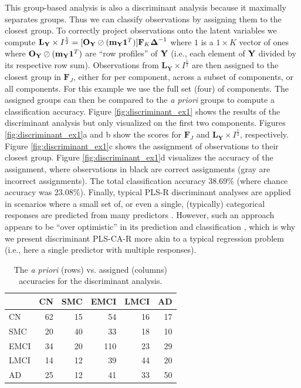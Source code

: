\documentclass[12pt]{article}
\begin{document}
This group-based analysis is also a discriminant analysis because it
maximally separates groups. Thus we can classify observations by
assigning them to the closest group. To correctly project observations
onto the latent variables we compute
\({\mathbf L}_{\mathbf Y} \times I^{\frac{1}{2}} = [{\bf O}_{\bf Y} \oslash ({\bf m}_{\bf Y}{\bf 1}^T)]{\bf F}_{K}\boldsymbol{\Delta}^{-1}\)
where \(1\) is a \(1 \times K\) vector of ones where
\({\bf O}_{\bf Y} \oslash ({\bf m}_{\bf Y}{\bf 1}^T)\) are ``row
profiles'' of \({\bf Y}\) (i.e., each element of \({\bf Y}\) divided by
its respective row sum). Observations from
\({\mathbf L}_{\mathbf Y} \times I^{\frac{1}{2}}\) are then assigned to
the closest group in \({\mathbf F}_{J}\), either for per component,
across a subset of components, or all components. For this example we
use the full set (four) of components. The assigned groups can then be
compared to the \emph{a priori} groups to compute a classification
accuracy. Figure \ref{fig:discriminant_ex1} shows the results of the
discriminant analysis but only visualized on the first two components.
Figures \ref{fig:discriminant_ex1}a and b show the scores for
\({\mathbf F}_{J}\) and
\({\mathbf L}_{\mathbf Y} \times I^{\frac{1}{2}}\), respectively. Figure
\ref{fig:discriminant_ex1}c shows the assignment of observations to
their closest group. Figure \ref{fig:discriminant_ex1}d visualizes the
accuracy of the assignment, where observations in black are correct
assignments (gray are incorrect assignments). The total classification
accuracy 38.69\% (where chance accuracy was 23.08\%). Finally, typical
PLS-R discriminant analyses are applied in scenarios where a small set
of, or even a single, (typically) categorical responses are predicted
from many predictors \citep{perez-enciso_prediction_2003}. However, such
an approach appears to be ``over optimistic'' in its prediction and
classification \citep{rodriguez-perez_overoptimism_2018}, which is why
we present discriminant PLS-CA-R more akin to a typical regression
problem (i.e., here a single predictor with multiple responses).

\begin{table}[!h]

\caption{\label{tab:unnamed-chunk-7}\label{table:assign_ex1} The \textit{a priori} (rows) vs. assigned (columns) accuracies for the discriminant analysis.}
\centering
\begin{tabular}{lrrrrr}
\toprule
  & CN & SMC & EMCI & LMCI & AD\\
\midrule
CN & 62 & 15 & 54 & 16 & 17\\
SMC & 20 & 40 & 33 & 18 & 10\\
EMCI & 34 & 20 & 110 & 23 & 29\\
LMCI & 14 & 12 & 39 & 44 & 20\\
AD & 25 & 12 & 41 & 33 & 50\\
\bottomrule
\end{tabular}
\end{table}
\end{document}
